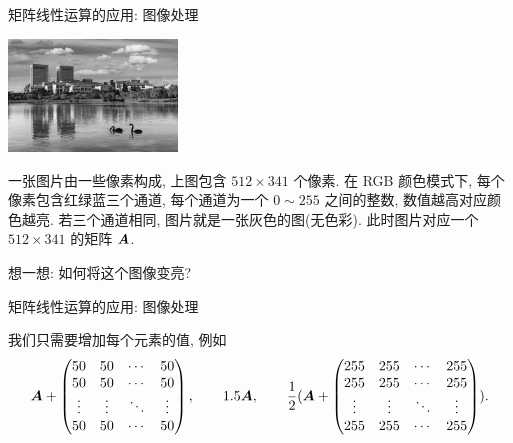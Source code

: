 \begin{frame}{矩阵线性运算的应用: 图像处理\noexer}
	\onslide<+->
	\begin{center}
		\includegraphics[height=3cm]{../image/matrix2.jpg}
	\end{center}

	\onslide<+->
	一张图片由一些像素构成, 上图包含 $512\times341$ 个像素.
	\onslide<+->
	在 RGB 颜色模式下, 每个像素包含红绿蓝三个通道, 每个通道为一个 $0\sim255$ 之间的整数, 数值越高对应颜色越亮.
	\onslide<+->
	若三个通道相同, 图片就是一张灰色的图(无色彩).
	此时图片对应一个 $512\times 341$ 的矩阵 ${\boldsymbol{A}}$.

	\onslide<+->
	想一想: 如何将这个图像变亮?
\end{frame}


\begin{frame}{矩阵线性运算的应用: 图像处理\noexer}
	\onslide<+->
	\begin{center}
	\end{center}

	\onslide<+->
	我们只需要增加每个元素的值, 例如
	\[{\boldsymbol{A}}+\begin{pmatrix}
		50&50&\cdots&50\\
		50&50&\cdots&50\\
		\vdots&\vdots&\ddots&\vdots\\
		50&50&\cdots&50
	\end{pmatrix},\qquad
	1.5{\boldsymbol{A}},\qquad\frac12({\boldsymbol{A}}+\begin{pmatrix}
		255&255&\cdots&255\\
		255&255&\cdots&255\\
		\vdots&\vdots&\ddots&\vdots\\
		255&255&\cdots&255
	\end{pmatrix}).\]
\end{frame}


